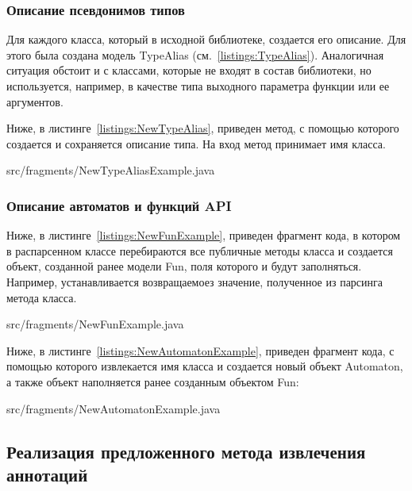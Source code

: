 \subsubsection{Описание псевдонимов типов}

Для каждого класса, который в исходной библиотеке, создается его описание. Для этого была создана модель TypeAlias (см.~\ref{listings:TypeAlias}).
Аналогичная ситуация обстоит и с классами, которые не входят в состав библиотеки, но используется, например, в качестве типа выходного параметра функции или ее аргументов.

Ниже, в листинге~\ref{listings:NewTypeAlias}, приведен метод, с помощью которого создается и сохраняется описание типа. На вход метод принимает имя класса.

{src/fragments/NewTypeAliasExample.java}

\subsubsection{Описание автоматов и функций API}

Ниже, в листинге~\ref{listings:NewFunExample}, приведен фрагмент кода, в котором в распарсенном классе перебираются все публичные методы класса и создается объект, созданной ранее модели Fun, поля которого и будут заполняться.
Например, устанавливается возвращаемоез значение, полученное из парсинга метода класса.

{src/fragments/NewFunExample.java}

Ниже, в листинге~\ref{listings:NewAutomatonExample}, приведен фрагмент кода, с помощью которого извлекается имя класса и создается новый объект Automaton, а также объект наполняется ранее созданным объектом Fun:
\newpage

{src/fragments/NewAutomatonExample.java}

\subsection{Реализация предложенного метода извлечения аннотаций}

